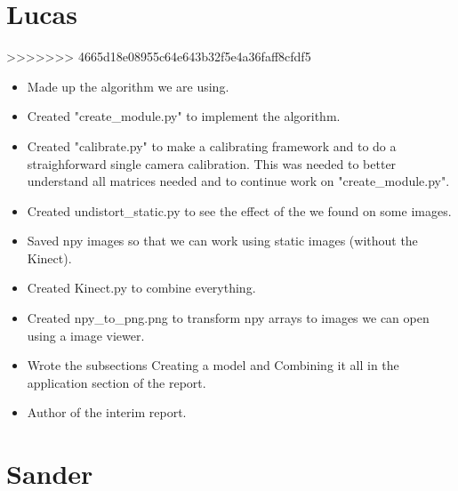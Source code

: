 \section*{Lucas}
>>>>>>> 4665d18e08955c64e643b32f5e4a36faff8cfdf5
\begin{itemize}
\item Made up the algorithm we are using.
\item Created "create\_module.py" to implement the algorithm.
\item Created "calibrate.py" to make a calibrating framework and to do a 
straighforward single camera calibration. This was needed to better understand 
all matrices needed and to continue work on "create\_module.py".
\item Created undistort\_static.py to see the effect of the we found on some images.
\item Saved npy images so that we can work using static images (without the Kinect).
\item Created Kinect.py to combine everything.
\item Created npy\_to\_png.png to transform npy arrays to images we can open 
using a image viewer.
\item Wrote the subsections Creating a model and Combining it all in the 
application section of the report.
\item Author of the interim report.
\end{itemize}
\section*{Sander}
